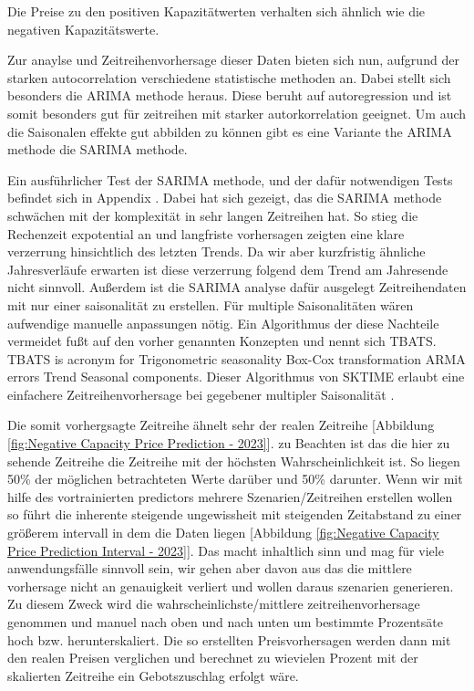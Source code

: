 Die Preise zu den positiven Kapazitätwerten verhalten sich ähnlich wie die negativen Kapazitätswerte.

Zur anaylse und Zeitreihenvorhersage dieser Daten bieten sich nun, aufgrund der starken autocorrelation verschiedene statistische methoden an.
Dabei stellt sich besonders die ARIMA methode heraus. Diese beruht auf autoregression und ist somit besonders gut für zeitreihen mit starker
autorkorrelation geeignet. Um auch die Saisonalen effekte gut abbilden zu können gibt es eine Variante the ARIMA methode die SARIMA methode.

Ein ausführlicher Test der SARIMA methode, und der dafür notwendigen Tests befindet sich in Appendix . Dabei hat sich gezeigt, das die SARIMA methode schwächen mit der
komplexität in sehr langen Zeitreihen hat. So stieg die Rechenzeit expotential an und langfriste vorhersagen zeigten eine klare verzerrung hinsichtlich des letzten Trends.
Da wir aber kurzfristig ähnliche Jahresverläufe erwarten ist diese verzerrung folgend dem Trend am Jahresende nicht sinnvoll.
Außerdem ist die SARIMA analyse dafür ausgelegt Zeitreihendaten mit nur einer saisonalität zu erstellen. Für multiple Saisonalitäten wären aufwendige
manuelle anpassungen nötig. Ein Algorithmus der diese Nachteile vermeidet fußt auf den vorher genannten Konzepten und nennt sich TBATS.
TBATS is acronym for Trigonometric seasonality Box-Cox transformation ARMA errors Trend Seasonal components. Dieser Algorithmus von SKTIME erlaubt eine
einfachere Zeitreihenvorhersage bei gegebener multipler Saisonalität \cite{.05.04.2025}. 

Die somit vorhergsagte Zeitreihe ähnelt sehr der realen Zeitreihe [Abbildung \ref{fig:Negative Capacity Price Prediction - 2023}]. zu Beachten ist das die hier zu sehende Zeitreihe die Zeitreihe mit der höchsten Wahrscheinlichkeit ist.
So liegen 50\% der möglichen betrachteten Werte darüber und 50\% darunter. Wenn wir mit hilfe des vortrainierten predictors mehrere Szenarien/Zeitreihen
erstellen wollen so führt die inherente steigende ungewissheit mit steigenden Zeitabstand zu einer größerem intervall in dem die Daten liegen [Abbildung \ref{fig:Negative Capacity Price Prediction Interval - 2023}].
Das macht inhaltlich sinn und mag für viele anwendungsfälle sinnvoll sein, wir gehen aber davon aus das die mittlere vorhersage nicht an genauigkeit verliert
und wollen daraus szenarien generieren. Zu diesem Zweck wird die wahrscheinlichste/mittlere zeitreihenvorhersage genommen und manuel nach oben und nach unten
um bestimmte Prozentsäte hoch bzw. herunterskaliert. Die so erstellten Preisvorhersagen werden dann mit den realen Preisen verglichen und berechnet zu wievielen
Prozent mit der skalierten Zeitreihe ein Gebotszuschlag erfolgt wäre.

